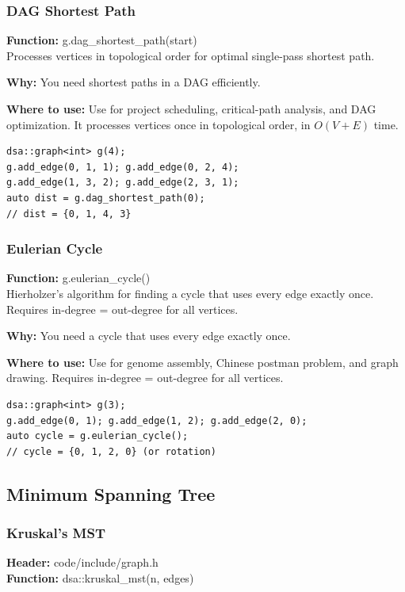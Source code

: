 \documentclass[11pt]{article}
\begin{document}
\subsubsection{DAG Shortest Path}
\textbf{Function:} g.dag\_shortest\_path(start)\\

Processes vertices in topological order for optimal single-pass shortest path.

\textbf{Why:} You need shortest paths in a DAG efficiently. \par \textbf{Where to use:} Use for project scheduling, critical-path analysis, and DAG optimization. It processes vertices once in topological order, in \(O(V+E)\) time.

\begin{lstlisting}
dsa::graph<int> g(4);
g.add_edge(0, 1, 1); g.add_edge(0, 2, 4);
g.add_edge(1, 3, 2); g.add_edge(2, 3, 1);
auto dist = g.dag_shortest_path(0);
// dist = {0, 1, 4, 3}
\end{lstlisting}

\subsubsection{Eulerian Cycle}
\textbf{Function:} g.eulerian\_cycle()\\

Hierholzer's algorithm for finding a cycle that uses every edge exactly once. Requires in-degree = out-degree for all vertices.

\textbf{Why:} You need a cycle that uses every edge exactly once. \par \textbf{Where to use:} Use for genome assembly, Chinese postman problem, and graph drawing. Requires in-degree = out-degree for all vertices.

\begin{lstlisting}
dsa::graph<int> g(3);
g.add_edge(0, 1); g.add_edge(1, 2); g.add_edge(2, 0);
auto cycle = g.eulerian_cycle();
// cycle = {0, 1, 2, 0} (or rotation)
\end{lstlisting}

\subsection{Minimum Spanning Tree}

\subsubsection{Kruskal's MST}
\textbf{Header:} code/include/graph.h\\
\textbf{Function:} dsa::kruskal\_mst(n, edges)\\
\end{document}
